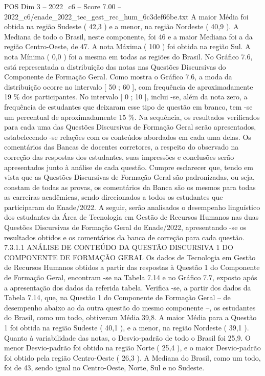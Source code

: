 \begin{textsample}{POS Dim 3 – 2022\_c6 – Score 7.00 – 2022\_c6/enade\_2022\_tec\_gest\_rec\_hum\_6c3def66be.txt}
A maior Média foi obtida na região Sudeste ( 42,3 ) e a menor, na região Nordeste ( 40,9 ).
A Mediana de todo o Brasil, neste componente, foi 46 e a maior Mediana foi a da região Centro-Oeste, de 47.
A nota Máxima ( 100 ) foi obtida na região Sul.
A nota Mínima ( 0,0 ) foi a mesma em todas as regiões do Brasil.
No Gráfico 7.6, está representada a distribuição das notas nas Questões Discursivas do Componente de Formação Geral.
Como mostra o Gráfico 7.6, a moda da distribuição ocorre no intervalo [ 50 ; 60 ], com frequência de aproximadamente 19 \% dos participantes.
No intervalo [ 0 ; 10 ], inclui -se, além da nota zero, a frequência de estudantes que deixaram esse tipo de questão em branco, tem -se um percentual de aproximadamente 15 \%.
Na sequência, os resultados verificados para cada uma das Questões Discursivas de Formação Geral serão apresentados, estabelecendo -se relações com os conteúdos abordados em cada uma delas.
Os comentários das Bancas de docentes corretores, a respeito do observado na correção das respostas dos estudantes, suas impressões e conclusões serão apresentados junto à análise de cada questão.
Cumpre esclarecer que, tendo em vista que as Questões Discursivas de Formação Geral são padronizadas, ou seja, constam de todas as provas, os comentários da Banca são os mesmos para todas as carreiras acadêmicas, sendo direcionados a todos os estudantes que participaram do Enade/2022.
A seguir, serão analisados o desempenho linguístico dos estudantes da Área de Tecnologia em Gestão de Recursos Humanos nas duas Questões Discursivas de Formação Geral do Enade/2022, apresentando -se os resultados obtidos e os comentários da banca de correção para cada questão. 7.3.1.1 ANÁLISE DE CONTEÚDO DA QUESTÃO DISCURSIVA 1 DO COMPONENTE DE FORMAÇÃO GERAL Os dados de Tecnologia em Gestão de Recursos Humanos obtidos a partir das respostas à Questão 1 do Componente de Formação Geral, encontram -se na Tabela 7.14 e no Gráfico 7.7, exposto após a apresentação dos dados da referida tabela.
Verifica -se, a partir dos dados da Tabela 7.14, que, na Questão 1 do Componente de Formação Geral – de desempenho abaixo ao da outra questão do mesmo componente –, os estudantes do Brasil, como um todo, obtiveram Média 39,8.
A maior Média para a Questão 1 foi obtida na região Sudeste ( 40,1 ), e a menor, na região Nordeste ( 39,1 ).
Quanto à variabilidade das notas, o Desvio-padrão de todo o Brasil foi 25,9.
O menor Desvio-padrão foi obtido na região Norte ( 25,4 ), e o maior Desvio-padrão foi obtido pela região Centro-Oeste ( 26,3 ).
A Mediana do Brasil, como um todo, foi de 43, sendo igual no Centro-Oeste, Norte, Sul e no Sudeste.

\end{textsample}
